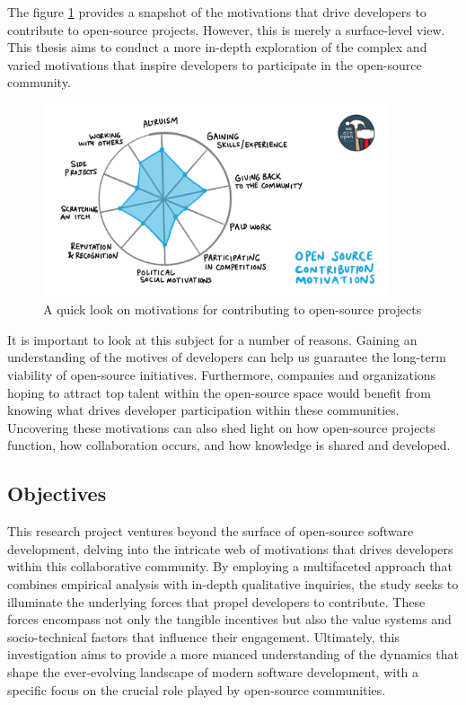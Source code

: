 The figure \ref{fig:illustration} provides a snapshot of the motivations that drive developers to contribute to open-source projects. However, this is merely a surface-level view. This thesis aims to conduct a more in-depth exploration of the complex and varied motivations that inspire developers to participate in the open-source community.

\begin{figure}[ht]
    \centering
    \includegraphics[width=0.9\textwidth]{figs/illustration.png}
    \caption{A quick look on motivations for contributing to open-source projects \citep{Belshaw_2020}}
    \label{fig:illustration}
\end{figure}

It is important to look at this subject for a number of reasons. Gaining an understanding of the motives of developers can help us guarantee the long-term viability of open-source initiatives. Furthermore, companies and organizations hoping to attract top talent within the open-source space would benefit from knowing what drives developer participation within these communities.  Uncovering these motivations can also shed light on how open-source projects function, how collaboration occurs, and how knowledge is shared and developed.

\subsection{Objectives}

This research project ventures beyond the surface of open-source software development, delving into the intricate web of motivations that drives developers within this collaborative community. By employing a multifaceted approach that combines empirical analysis with in-depth qualitative inquiries, the study seeks to illuminate the underlying forces that propel developers to contribute. These forces encompass not only the tangible incentives but also the value systems and socio-technical factors that influence their engagement. Ultimately, this investigation aims to provide a more nuanced understanding of the dynamics that shape the ever-evolving landscape of modern software development, with a specific focus on the crucial role played by open-source communities.

